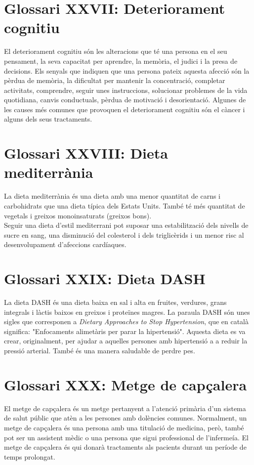 \documentclass[a4paper,12pt]{report}
\begin{document}
\section*{Glossari XXVII: Deteriorament cognitiu}
El deteriorament cognitiu són les alteracions que té una persona en el seu pensament, la seva capacitat per aprendre, la memòria, el judici i la presa de decisions. Els senyals que indiquen que una persona pateix aquesta afecció són la pèrdua de memòria, la dificultat per mantenir la concentració, completar activitats, comprendre, seguir unes instruccions, solucionar problemes de la vida quotidiana, canvis conductuals, pèrdua de motivació i desorientació. Algunes de les causes més comunes que provoquen el deteriorament cognitiu són el càncer i alguns dels seus tractaments.
\section*{Glossari XXVIII: Dieta mediterrània}
La dieta mediterrània és una dieta amb una menor quantitat de carns i carbohidrats que una dieta típica dels Estats Units. També té més quantitat de vegetals i greixos monoinsaturats (greixos bons).\\
Seguir una dieta d'estil mediterrani pot suposar una estabilització dels nivells de sucre en sang, una disminució del colesterol i dels triglicèrids i un menor risc al desenvolupament d'afeccions cardíaques.
\section*{Glossari XXIX: Dieta DASH}
La dieta DASH és una dieta baixa en sal i alta en fruites, verdures, grans integrals i làctis baixos en greixos i proteïnes magres. La paraula DASH són unes sigles que corresponen a \textit{Dietary Approaches to Stop Hypertension}, que en català significa: "Enfocaments alimetàris per parar la hipertensió". Aquesta dieta es va crear, originalment, per ajudar a aquelles persones amb hipertensió a a reduir la pressió arterial. També és una manera saludable de perdre pes.
\section*{Glossari XXX: Metge de capçalera}
El metge de capçalera és un metge pertanyent a l'atenció primària d'un sistema de salut públic que atèn a les persones amb dolències comunes. Normalment, un metge de capçalera és una persona amb una titulació de medicina, però, també pot ser un assistent mèdic o una persona que sigui professional de l'infermeía. El metge de capçalera és qui donarà tractaments als pacients durant un període de temps prolongat.
\end{document}
